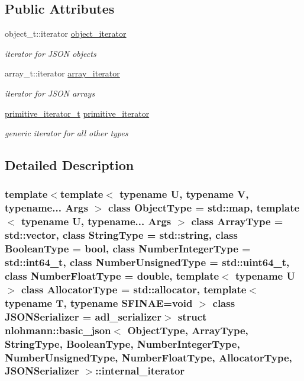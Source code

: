 \subsection*{Public Attributes}
\begin{DoxyCompactItemize}
\item 
object\+\_\+t\+::iterator \hyperlink{structnlohmann_1_1basic__json_1_1internal__iterator_a737aaeccb3a9de3301b5e363c7cbd52f}{object\+\_\+iterator}
\begin{DoxyCompactList}\small\item\em iterator for J\+S\+ON objects \end{DoxyCompactList}\item 
array\+\_\+t\+::iterator \hyperlink{structnlohmann_1_1basic__json_1_1internal__iterator_ac2ffb13621ff7e261362624c4b790049}{array\+\_\+iterator}
\begin{DoxyCompactList}\small\item\em iterator for J\+S\+ON arrays \end{DoxyCompactList}\item 
\hyperlink{classnlohmann_1_1basic__json_1_1primitive__iterator__t}{primitive\+\_\+iterator\+\_\+t} \hyperlink{structnlohmann_1_1basic__json_1_1internal__iterator_ac1938c3d3d3d713b68a7a82d7cb569eb}{primitive\+\_\+iterator}
\begin{DoxyCompactList}\small\item\em generic iterator for all other types \end{DoxyCompactList}\end{DoxyCompactItemize}


\subsection{Detailed Description}
\subsubsection*{template$<$template$<$ typename U, typename V, typename... Args $>$ class Object\+Type = std\+::map, template$<$ typename U, typename... Args $>$ class Array\+Type = std\+::vector, class String\+Type = std\+::string, class Boolean\+Type = bool, class Number\+Integer\+Type = std\+::int64\+\_\+t, class Number\+Unsigned\+Type = std\+::uint64\+\_\+t, class Number\+Float\+Type = double, template$<$ typename U $>$ class Allocator\+Type = std\+::allocator, template$<$ typename T, typename S\+F\+I\+N\+A\+E=void $>$ class J\+S\+O\+N\+Serializer = adl\+\_\+serializer$>$\newline
struct nlohmann\+::basic\+\_\+json$<$ Object\+Type, Array\+Type, String\+Type, Boolean\+Type, Number\+Integer\+Type, Number\+Unsigned\+Type, Number\+Float\+Type, Allocator\+Type, J\+S\+O\+N\+Serializer $>$\+::internal\+\_\+iterator}

